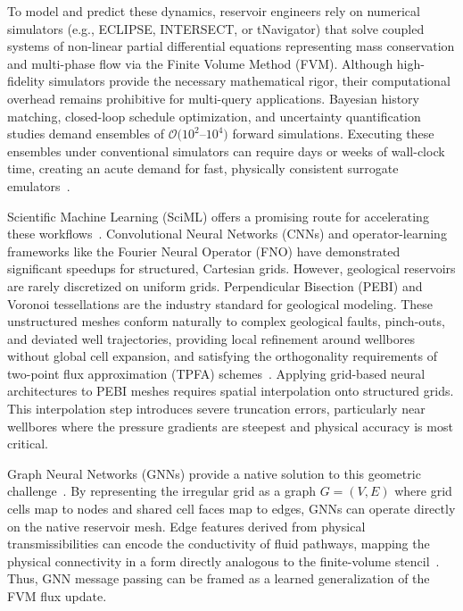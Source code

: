 \documentclass[10pt,twocolumn]{article}
\begin{document}
To model and predict these dynamics, reservoir engineers rely on numerical simulators (e.g., ECLIPSE, INTERSECT, or tNavigator) that solve coupled systems of non-linear partial differential equations representing mass conservation and multi-phase flow via the Finite Volume Method (FVM). Although high-fidelity simulators provide the necessary mathematical rigor, their computational overhead remains prohibitive for multi-query applications. Bayesian history matching, closed-loop schedule optimization, and uncertainty quantification studies demand ensembles of $\mathcal{O}(10^2$--$10^4)$ forward simulations. Executing these ensembles under conventional simulators can require days or weeks of wall-clock time, creating an acute demand for fast, physically consistent surrogate emulators~\cite{pal2023ccs, pal2021mlhistory}.

Scientific Machine Learning (SciML) offers a promising route for accelerating these workflows~\cite{farchi2021}. Convolutional Neural Networks (CNNs) and operator-learning frameworks like the Fourier Neural Operator (FNO) have demonstrated significant speedups for structured, Cartesian grids. However, geological reservoirs are rarely discretized on uniform grids. Perpendicular Bisection (PEBI) and Voronoi tessellations are the industry standard for geological modeling. These unstructured meshes conform naturally to complex geological faults, pinch-outs, and deviated well trajectories, providing local refinement around wellbores without global cell expansion, and satisfying the orthogonality requirements of two-point flux approximation (TPFA) schemes~\cite{ahmed2015mpfa}. Applying grid-based neural architectures to PEBI meshes requires spatial interpolation onto structured grids. This interpolation step introduces severe truncation errors, particularly near wellbores where the pressure gradients are steepest and physical accuracy is most critical.

Graph Neural Networks (GNNs) provide a native solution to this geometric challenge~\cite{geometric}. By representing the irregular grid as a graph $G = (V, E)$ where grid cells map to nodes and shared cell faces map to edges, GNNs can operate directly on the native reservoir mesh. Edge features derived from physical transmissibilities can encode the conductivity of fluid pathways, mapping the physical connectivity in a form directly analogous to the finite-volume stencil~\cite{pal2006tensor}. Thus, GNN message passing can be framed as a learned generalization of the FVM flux update.
\end{document}
